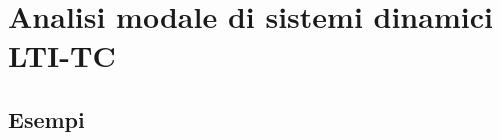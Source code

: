 \documentclass[../main.tex]{subfiles}
\begin{document}
\clearpage
\thispagestyle{empty}
\vspace*{7cm}
\section{Analisi modale di sistemi dinamici LTI-TC}
\vspace*{1.5cm}


\subsection{Esempi}
\end{document}
